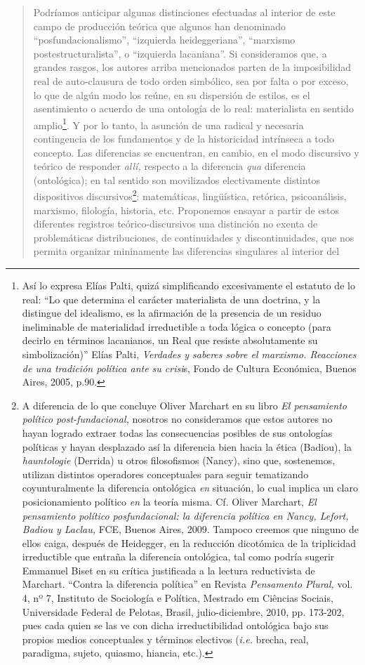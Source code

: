 \begin{quote}
Podríamos anticipar algunas distinciones efectuadas al interior de este campo de producción teórica que algunos han denominado \enquote{posfundacionalismo}, \enquote{izquierda heideggeriana}, \enquote{marxismo postestructuralista}, o \enquote{izquierda lacaniana}. Si consideramos que, a grandes rasgos, los autores arriba mencionados parten de la imposibilidad real de auto-clausura de todo orden simbólico, sea por falta o por exceso, lo que de algún modo los reúne, en su dispersión de estilos, es el asentimiento o acuerdo de una ontología de lo real: materialista en sentido amplio\footnote{Así lo expresa Elías Palti, quizá simplificando excesivamente el estatuto de lo real: \enquote{Lo que determina el carácter materialista de una doctrina, y la distingue del idealismo, es la afirmación de la presencia de un residuo ineliminable de materialidad irreductible a toda lógica o concepto (para decirlo en términos lacanianos, un Real que resiste absolutamente su simbolización)} Elías Palti, \emph{Verdades y saberes sobre el marxismo. Reacciones de una tradición política ante su crisi}s, Fondo de Cultura Económica, Buenos Aires, 2005, p.90.}. Y por lo tanto, la asunción de una radical y necesaria contingencia de los fundamentos y de la historicidad intrínseca a todo concepto. Las diferencias se encuentran, en cambio, en el modo discursivo y teórico de responder \emph{allí,} respecto a la diferencia \emph{qua} diferencia (ontológica); en tal sentido son movilizados electivamente distintos dispositivos discursivos\footnote{A diferencia de lo que concluye Oliver Marchart en su libro \emph{El pensamiento político post-fundacional,} nosotros no consideramos que estos autores no hayan logrado extraer todas las consecuencias posibles de sus ontologías políticas y hayan desplazado así la diferencia bien hacia la ética (Badiou), la \emph{hauntologie} (Derrida) u otros filosofismos (Nancy), sino que, sostenemos, utilizan distintos operadores conceptuales para seguir tematizando coyunturalmente la diferencia ontológica \emph{en} situación, lo cual implica un claro posicionamiento político \emph{en} la teoría misma. Cf. Oliver Marchart, \emph{El pensamiento político posfundacional: la diferencia política en Nancy, Lefort, Badiou y Laclau,} FCE, Buenos Aires, 2009. Tampoco creemos que ninguno de ellos caiga, después de Heidegger, en la reducción dicotómica de la triplicidad irreductible que entraña la diferencia ontológica, tal como podría sugerir Emmanuel Biset en su crítica justificada a la lectura reductivista de Marchart. \enquote{Contra la diferencia política} en Revista \emph{Pensamento Plural,} vol. 4, nº 7, Instituto de Sociología e Política, Mestrado em Ciências Sociais, Universidade Federal de Pelotas, Brasil, julio-diciembre, 2010, pp. 173-202, pues cada quien se las ve con dicha irreductibilidad ontológica bajo sus propios medios conceptuales y términos electivos (\emph{i.e.} brecha, real, paradigma, sujeto, quiasmo, hiancia, etc.).}: matemáticas, lingüística, retórica, psicoanálisis, marxismo, filología, historia, etc. Proponemos ensayar a partir de estos diferentes registros teórico-discursivos una distinción no exenta de problemáticas distribuciones, de continuidades y discontinuidades, que nos permita organizar mininamente las diferencias singulares al interior del 
\end{quote}
